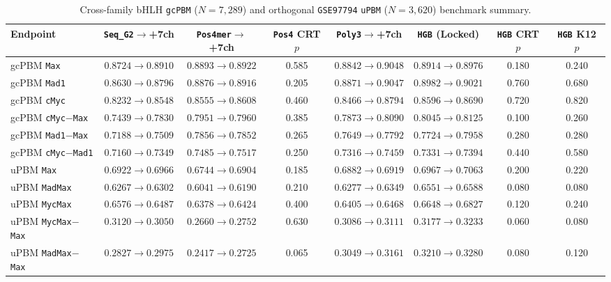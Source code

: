 \documentclass[11pt,a4paper]{article}
\begin{document}
\begin{table}[htbp]
  \centering
  \caption{Cross-family bHLH \texttt{gcPBM} ($N = 7{,}289$) and orthogonal \texttt{GSE97794} \texttt{uPBM} ($N = 3{,}620$) benchmark summary.}
  \label{tab:bhlh}
  \scriptsize
  \begin{tabular}{lccccccc}
    \toprule
    Endpoint & \texttt{Seq\_G2}$\to$+7ch & \texttt{Pos4mer}$\to$+7ch & \texttt{Pos4} CRT $p$ & \texttt{Poly3}$\to$+7ch & \texttt{HGB} (Locked) & \texttt{HGB} CRT $p$ & \texttt{HGB} K12 $p$ \\
    \midrule
    gcPBM \texttt{Max} & $0.8724\to 0.8910$ & $0.8893\to 0.8922$ & 0.585 & $0.8842\to 0.9048$ & $0.8914\to 0.8976$ & 0.180 & 0.240 \\
    gcPBM \texttt{Mad1} & $0.8630\to 0.8796$ & $0.8876\to 0.8916$ & 0.205 & $0.8871\to 0.9047$ & $0.8982\to 0.9021$ & 0.760 & 0.680 \\
    gcPBM \texttt{cMyc} & $0.8232\to 0.8548$ & $0.8555\to 0.8608$ & 0.460 & $0.8466\to 0.8794$ & $0.8596\to 0.8690$ & 0.720 & 0.820 \\
    gcPBM \texttt{cMyc$-$Max} & $0.7439\to 0.7830$ & $0.7951\to 0.7960$ & 0.385 & $0.7873\to 0.8090$ & $0.8045\to 0.8125$ & 0.100 & 0.260 \\
    gcPBM \texttt{Mad1$-$Max} & $0.7188\to 0.7509$ & $0.7856\to 0.7852$ & 0.265 & $0.7649\to 0.7792$ & $0.7724\to 0.7958$ & 0.280 & 0.280 \\
    gcPBM \texttt{cMyc$-$Mad1} & $0.7160\to 0.7349$ & $0.7485\to 0.7517$ & 0.250 & $0.7316\to 0.7459$ & $0.7331\to 0.7394$ & 0.440 & 0.580 \\
    \midrule
    uPBM \texttt{Max} & $0.6922\to 0.6966$ & $0.6744\to 0.6904$ & 0.185 & $0.6882\to 0.6919$ & $0.6967\to 0.7063$ & 0.200 & 0.220 \\
    uPBM \texttt{MadMax} & $0.6267\to 0.6302$ & $0.6041\to 0.6190$ & 0.210 & $0.6277\to 0.6349$ & $0.6551\to 0.6588$ & 0.080 & 0.080 \\
    uPBM \texttt{MycMax} & $0.6576\to 0.6487$ & $0.6378\to 0.6424$ & 0.400 & $0.6405\to 0.6468$ & $0.6648\to 0.6827$ & 0.120 & 0.240 \\
    uPBM \texttt{MycMax$-$Max} & $0.3120\to 0.3050$ & $0.2660\to 0.2752$ & 0.630 & $0.3086\to 0.3111$ & $0.3177\to 0.3233$ & 0.060 & 0.080 \\
    uPBM \texttt{MadMax$-$Max} & $0.2827\to 0.2975$ & $0.2417\to 0.2725$ & 0.065 & $0.3049\to 0.3161$ & $0.3210\to 0.3280$ & 0.080 & 0.120 \\
    \bottomrule
  \end{tabular}
\end{table}
\end{document}
